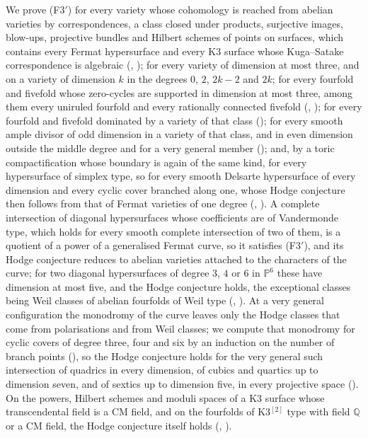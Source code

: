 \documentclass[11pt,reqno]{amsart}
\theoremstyle{plain}
\theoremstyle{definition}
\theoremstyle{remark}
\newcommand{\QQ}{\mathbb{Q}}
\newcommand{\PP}{\mathbb{P}}
\begin{document}
We prove (F3$'$) for every variety whose cohomology is reached from abelian
varieties by correspondences, a class closed under products, surjective
images, blow-ups, projective bundles and Hilbert schemes of points on
surfaces, which contains every Fermat hypersurface and every K3 surface whose
Kuga--Satake correspondence is algebraic (,
); for every variety of dimension at most three, and on
a variety of dimension $k$ in the degrees $0$, $2$, $2k-2$ and $2k$; for
every fourfold and fivefold whose zero-cycles are supported in dimension at
most three, among them every uniruled fourfold and every rationally connected
fivefold (, ); for every
fourfold and fivefold dominated by a variety of that class
(); for every smooth ample divisor of odd
dimension in a variety of that class, and in even dimension outside the
middle degree and for a very general member ();
and, by a toric compactification whose boundary is again of the same kind, for
every hypersurface of simplex type, so for every smooth Delsarte hypersurface
of every dimension and every cyclic cover branched along one, whose Hodge
conjecture then follows from that of Fermat varieties of one degree
(, ). A complete intersection
of diagonal hypersurfaces whose coefficients are of Vandermonde type, which
holds for every smooth complete intersection of two of them, is a quotient
of a power of a generalised Fermat curve, so it satisfies (F3$'$), and its
Hodge conjecture reduces to abelian varieties attached to the characters of
the curve; for two diagonal hypersurfaces of degree $3$, $4$ or $6$ in
$\PP^{6}$ these have dimension at most five, and the Hodge conjecture holds,
the exceptional classes being Weil classes of abelian fourfolds of Weil type
(, ). At a very general
configuration the monodromy of the curve leaves only the Hodge classes that
come from polarisations and from Weil classes; we compute that monodromy for
cyclic covers of degree three, four and six by an induction on the number of
branch points (), so the Hodge conjecture holds
for the very general such intersection of quadrics in every dimension, of
cubics and quartics up to dimension seven, and of sextics up to dimension
five, in every projective space (). On the powers, Hilbert
schemes and moduli spaces of a K3 surface whose transcendental field is a CM
field, and on the fourfolds of K3$^{[2]}$ type with field $\QQ$ or a CM
field, the Hodge conjecture itself holds (,
).
\end{document}
